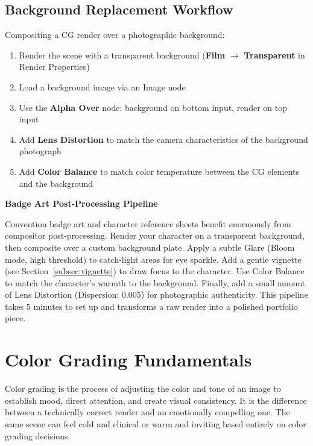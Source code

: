 \subsection{Background Replacement Workflow}

Compositing a CG render over a photographic background:

\begin{enumerate}[leftmargin=2em]
  \item Render the scene with a transparent background (\textbf{Film} $\rightarrow$ \textbf{Transparent} in Render Properties)
  \item Load a background image via an Image node
  \item Use the \textbf{Alpha Over} node: background on bottom input, render on top input
  \item Add \textbf{Lens Distortion} to match the camera characteristics of the background photograph
  \item Add \textbf{Color Balance} to match color temperature between the CG elements and the background
\end{enumerate}

\begin{furrybox}
\textbf{Badge Art Post-Processing Pipeline}

Convention badge art and character reference sheets benefit enormously from compositor post-processing. Render your character on a transparent background, then composite over a custom background plate. Apply a subtle Glare (Bloom mode, high threshold) to catch-light areas for eye sparkle. Add a gentle vignette (see Section~\ref{subsec:vignette}) to draw focus to the character. Use Color Balance to match the character's warmth to the background. Finally, add a small amount of Lens Distortion (Dispersion: 0.005) for photographic authenticity. This pipeline takes 5 minutes to set up and transforms a raw render into a polished portfolio piece.
\end{furrybox}

\section{Color Grading Fundamentals}
\label{sec:color-grading}

Color grading is the process of adjusting the color and tone of an image to establish mood, direct attention, and create visual consistency. It is the difference between a technically correct render and an emotionally compelling one. The same scene can feel cold and clinical or warm and inviting based entirely on color grading decisions.

